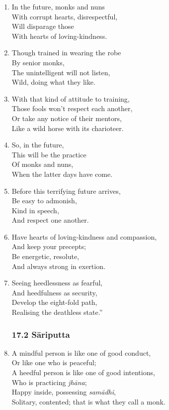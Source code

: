 \documentclass[10pt, openany]{book}
\newcommand*{\vleftofline}[1]{\leavevmode\llap{#1}}
\begin{document}
\begin{enumerate}
\item In the future, monks and nuns\\
With corrupt hearts, disrespectful,\\
Will disparage those\\
With hearts of loving-kindness.

\item Though trained in wearing the robe\\
By senior monks,\\
The unintelligent will not listen,\\
Wild, doing what they like.

\item With that kind of attitude to training,\\
Those fools won’t respect each another,\\
Or take any notice of their mentors,\\
Like a wild horse with its charioteer.

\item So, in the future,\\
This will be the practice\\
Of monks and nuns,\\
When the latter days have come.

\item Before this terrifying future arrives,\\
Be easy to admonish,\\
Kind in speech,\\
And respect one another.

\item Have hearts of loving-kindness and compassion,\\
And keep your precepts;\\
Be energetic, resolute,\\
And always strong in exertion.

\item Seeing heedlessness as fearful,\\
And heedfulness as security,\\
Develop the eight-fold path,\\
Realising the deathless state.”

\subsubsection*{17.2 Sāriputta}

\item \vleftofline{“}A mindful person is like one of good conduct,\\
Or like one who is peaceful;\\
A heedful person is like one of good intentions,\\
Who is practicing \emph{jhāna};\\
Happy inside, possessing \emph{samādhi},\\
Solitary, contented; that is what they call a monk.


\end{enumerate}
\end{document}
